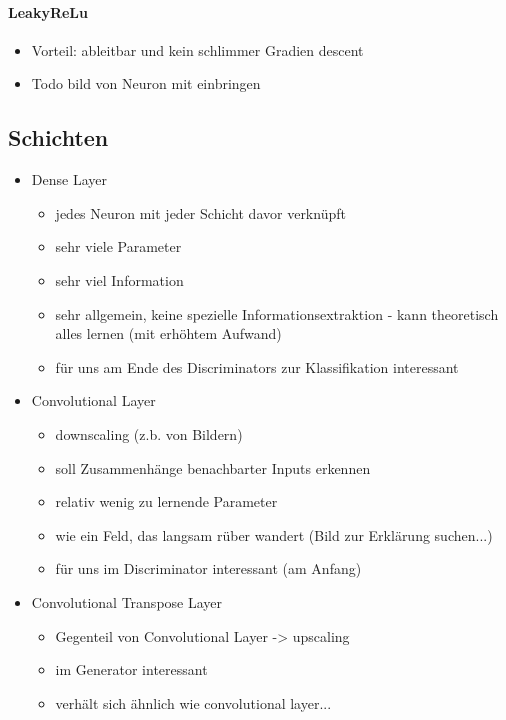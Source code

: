 \paragraph{LeakyReLu}
\begin{itemize}
	\item Vorteil: ableitbar und kein schlimmer Gradien descent
	\item Todo bild von Neuron mit einbringen
\end{itemize}


\subsection{Schichten}
\begin{itemize}
	\item Dense Layer
	\begin{itemize}
		\item jedes Neuron mit jeder Schicht davor verknüpft
		\item sehr viele Parameter
		\item sehr viel Information
		\item sehr allgemein, keine spezielle Informationsextraktion - kann theoretisch alles lernen (mit erhöhtem Aufwand)
		\item für uns am Ende des Discriminators zur Klassifikation interessant
	\end{itemize}
	\item Convolutional Layer
	\begin{itemize}
		\item downscaling (z.b. von Bildern)
		\item soll Zusammenhänge benachbarter Inputs erkennen
		\item relativ wenig zu lernende Parameter
		\item wie ein Feld, das langsam rüber wandert (Bild zur Erklärung suchen...)
		\item für uns im Discriminator interessant (am Anfang)
	\end{itemize}
	\item Convolutional Transpose Layer
	\begin{itemize}
		\item Gegenteil von Convolutional Layer -> upscaling
		\item im Generator interessant
		\item verhält sich ähnlich wie convolutional layer...
	\end{itemize}
\end{itemize}

